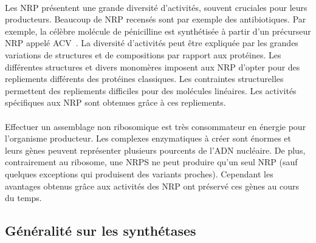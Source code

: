\documentclass[12pt,french,twoside]{report}
\begin{document}
\paragraph{}Les NRP présentent une grande diversité d'activités, souvent cruciales pour leurs producteurs.
Beaucoup de NRP recensés sont par exemple des antibiotiques.
Par exemple, la célèbre molécule de pénicilline est synthétisée à partir d'un précurseur NRP appelé ACV~\cite{queener_molecular_1990}.
La diversité d'activités peut être expliquée par les grandes variations de structures et de compositions par rapport aux protéines.
Les différentes structures et divers monomères imposent aux NRP d'opter pour des repliements différents des protéines classiques.
Les contraintes structurelles permettent des repliements difficiles pour des molécules linéaires.
Les activités spécifiques aux NRP sont obtenues grâce à ces repliements.

\paragraph{}Effectuer un assemblage non ribosomique est très consommateur en énergie pour l'organisme producteur.
Les complexes enzymatiques à créer sont énormes et leurs gènes peuvent représenter plusieurs pourcents de l'ADN nucléaire.
De plus, contrairement au ribosome, une NRPS ne peut produire qu'un seul NRP (sauf quelques exceptions qui produisent des variants proches).
Cependant les avantages obtenus grâce aux activités des NRP ont préservé ces gènes au cours du temps.


\subsection{Généralité sur les synthétases}
\end{document}

